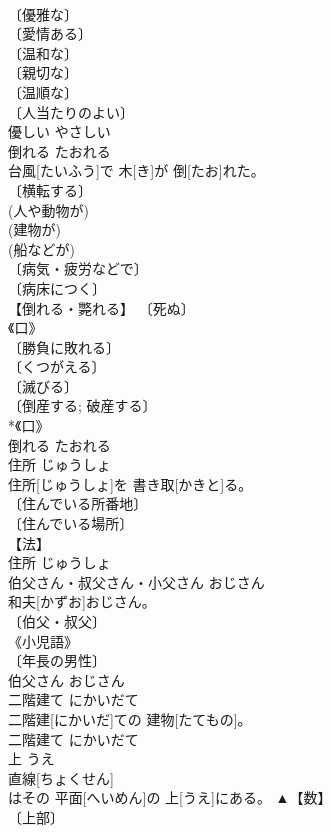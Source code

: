 \documentclass[8pt]{extreport}
\begin{document}
\begin{CJK}{UTF8}{min}
\\	〔優雅な〕 
\\	〔愛情ある〕 
\\	〔温和な〕 
\\	〔親切な〕 
\\	〔温順な〕 
\\	〔人当たりのよい〕 
\\	優しい	やさしい	
\\	倒れる	たおれる	
\\	台風[たいふう]で 木[き]が 倒[たお]れた。	
\\	〔横転する〕 
\\	(人や動物が) 
\\	(建物が) 
\\	(船などが) 
\\	〔病気・疲労などで〕 
\\	〔病床につく〕 
\\	【倒れる・斃れる】 〔死ぬ〕 
\\	《口》 
\\	〔勝負に敗れる〕 
\\	〔くつがえる〕 
\\	〔滅びる〕 
\\	〔倒産する; 破産する〕 
\\	*《口》 
\\	倒れる	たおれる	
\\	住所	じゅうしょ	
\\	住所[じゅうしょ]を 書き取[かきと]る。	
\\	〔住んでいる所番地〕 
\\	〔住んでいる場所〕 
\\	【法】 
\\	住所	じゅうしょ	
\\	伯父さん・叔父さん・小父さん	おじさん	
\\	和夫[かずお]おじさん。	
\\	〔伯父・叔父〕 
\\	《小児語》 
\\	〔年長の男性〕 
\\	伯父さん	おじさん	
\\	二階建て	にかいだて	
\\	二階建[にかいだ]ての 建物[たてもの]。	
\\	二階建て	にかいだて	
\\	上	うえ	
\\	直線[ちょくせん]
\\	はその 平面[へいめん]の 上[うえ]にある。	▲【数】 
\\	〔上部〕 

\end{CJK}
\end{document}

